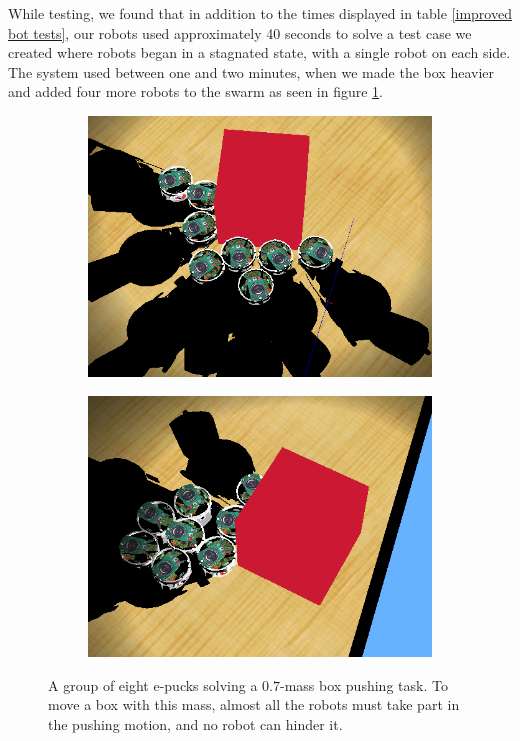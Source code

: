 \documentclass[a4paper,10pt]{article}
\begin{document}
While testing, we found that in addition to the times displayed in table
\ref{improved bot tests}, our robots used approximately 40 seconds to
solve a test case we created where robots began in a stagnated state,
with a single robot on each side. The system used between one and two 
minutes, when we made the box heavier and added four more robots to the swarm as seen
in figure \ref{fig:massrobots}.

\begin{figure}[!h]
    \centering

    \begin{subfigure}[!h]{0.45\textwidth}
        \includegraphics[width=\textwidth]{models/stresstest.PNG}
    \end{subfigure}
    \begin{subfigure}[!h]{0.45\textwidth}
        \includegraphics[width=\textwidth]{models/stresstest2.PNG}
    \end{subfigure}

    \caption{A group of eight e-pucks solving a $0.7$-mass box pushing task.
    To move a box with this mass, almost all the robots must take part in the
    pushing motion, and no robot can hinder it.}
    \label{fig:massrobots}
\end{figure}


\vspace{10pt}



 
\end{document}
